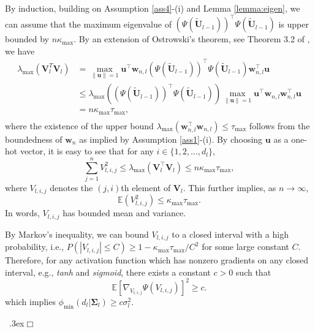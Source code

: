 \documentclass[11pt]{article}
\newcommand{\bw}{{\boldsymbol w}}
\newcommand{\bV}{{\boldsymbol V}}
\newcommand{\bU}{{\boldsymbol U}}
\newcommand{\bu}{{\boldsymbol u}}
\newcommand{\bSigma}{{\boldsymbol \Sigma}}
\newenvironment{proof}{\trivlist\item[\hskip \labelsep{\sc Proof:}]}
 {\unskip\nobreak\ \lower.3ex\hbox{$\Box$}\endtrivlist}
\begin{document}
\begin{proof}
By induction, building on Assumption \ref{ass4}-(i) and 
Lemma \ref{lemma:eigen},
we can assume that the maximum eigenvalue of $(\Psi(\tilde{\bU}_{l-1}))^{\top} \Psi (\tilde{\bU}_{l-1})$ is upper bounded by $n \kappa_{\max}$.
By an extension of Ostrowski's theorem, see Theorem 3.2 of \cite{Higham1998ModifyingTI},
we have 
\[
\begin{split}
\lambda_{\max}(\bV_l^T \bV_l) & = \max_{\|\bu\|=1} \bu^{\top} \bw_{n,l} (\Psi(\tilde{\bU}_{l-1}))^{\top} \Psi (\tilde{\bU}_{l-1}) \bw_{n,l}^{\top} \bu \\
&  \leq 
\lambda_{\max}( (\Psi(\tilde{\bU}_{l-1}))^{\top} \Psi (\tilde{\bU}_{l-1})) \max_{\|\bu\|=1} \bu^{\top} \bw_{n,l} \bw_{n,l}^{\top}\bu\\
& =n\kappa_{\max} \tau_{\max}, \\
\end{split}
\]
where the existence of the upper bound $\lambda_{\max}(\bw_{n,l}^{\top} \bw_{n,l}) \leq \tau_{\max}$ follows from the boundedness of $\bw_n$ as implied by Assumption \ref{ass1}-(i). 
By choosing $\bu$ as a one-hot vector, it is easy to see that for any $i \in \{1,2,\ldots,d_l\}$, 
\begin{equation} \label{eigenboundeq}
 \sum_{j=1}^n V_{l,i,j}^2 \leq \lambda_{\max}(\bV_l^{\top} \bV_l) \leq n \kappa_{\max} \tau_{\max}, 
\end{equation}
where $V_{l,i,j}$ denotes the $(j,i)$th element of $\bV_l$. This further implies, as $n\to \infty$, 
\begin{equation} \label{meanVeq}
 \mathbb{E} (V_{l,i,j}^2)  \leq \kappa_{\max} \tau_{\max}. 
\end{equation}
In words, $V_{l,i,j}$ has bounded mean and variance.  

By Markov's inequality, we can bound $V_{l,i,j}$ to a closed interval with a high probability, i.e., $P(|V_{l,i,j}|\leq C)\geq 1- \kappa_{\max} \tau_{\max}/C^2$ for some large constant $C$. Therefore, for any  activation function which has nonzero gradients on any closed interval, e.g., {\it tanh} and {\it sigmoid}, there exists a constant $c>0$ such that 
\[
 \mathbb{E} [\nabla_{V_{l,i,j}} \Psi(V_{l,i,j})]^2 \geq c.
 \]
which implies $\phi_{\min}(d_{l}|\bSigma_l) \geq c \sigma_l^2$.


\end{proof}
\end{document}

